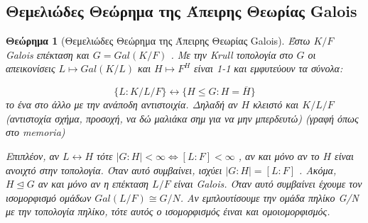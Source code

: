 \documentclass[oneside,a4paper]{article}
\newtheorem{theorem}{Θεώρημα}
\newcommand {\tl}{\textlatin}
\begin{document}
\subsection{Θεμελιώδες Θεώρημα της Άπειρης Θεωρίας \tl{Galois}}
\vspace{0.3truecm}

\begin{theorem}[Θεμελιώδες Θεώρημα της Άπειρης Θεωρίας \tl{Galois}]

Έστω $K/F$ Galois επέκταση και $G=Gal(K/F)$ .  Με την Krull τοπολογία στο $G$
οι απεικονίσεις $L \mapsto Gal(K/L)$ και $H \mapsto F^H$ είναι 1-1 και εμφυτεύουν τα σύνολα:

$$\{L : K/L/F \} \longleftrightarrow \{H \leq G: H = \overline H\}$$
το ένα στο άλλο με την ανάποδη αντιστοιχία. 
Δηλαδή αν $H$ κλειστό και $K/L/F$ (αντιστοχία σχήμα, προσοχή, να δώ μαλιάκα σημ για να μην μπερδευτώ) (γραφή όπως στο memoria)

Επιπλέον, αν $L \longleftrightarrow H$ τότε $|G:H| < \infty \iff [L:F] < \infty$ , αν και μόνο αν το $H$ είναι ανοιχτό στην τοπολογία. Όταν αυτό συμβαίνει, ισχύει $|G:H| = [L:F]$ . Ακόμα, $H \unlhd G$ αν και μόνο αν η επέκταση $L/F$ είναι Galois. Όταν αυτό συμβαίνει έχουμε τον ισομορφισμό ομάδων $Gal(L/F) \cong G/N$. Αν εμπλουτίσουμε την ομάδα πηλίκο G/N με την τοπολογία πηλίκο, τότε αυτός ο ισομορφισμός έιναι και ομοιομορφισμός.
\end{theorem}
\end{document}
